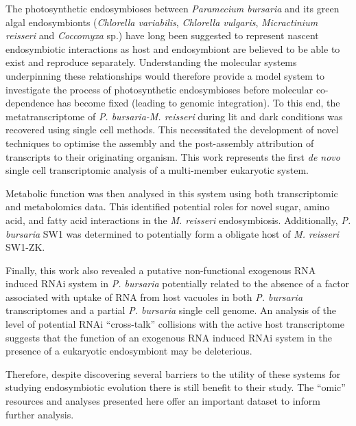The photosynthetic endosymbioses between \textit{Paramecium bursaria} and its green algal endosymbionts 
(\textit{Chlorella variabilis}, \textit{Chlorella vulgaris}, \textit{Micractinium reisseri} and \textit{Coccomyxa} sp.) 
have long been suggested to represent nascent endosymbiotic interactions as host and endosymbiont are believed to be able to exist and reproduce separately. 
Understanding the molecular systems underpinning these relationships would therefore 
provide a model system to investigate the process of photosynthetic endosymbioses 
before molecular co-dependence has become fixed (leading to genomic integration).
To this end, the metatranscriptome of \textit{P. bursaria-M. reisseri} during 
lit and dark conditions was recovered using single cell methods. 
This necessitated the development of novel techniques to optimise the 
assembly and the post-assembly attribution of transcripts to their originating organism. 
This work represents the first \textit{de novo} single cell transcriptomic analysis of a multi-member eukaryotic system.  


Metabolic function was then analysed in this system using both transcriptomic and metabolomics data.
This identified potential roles for novel sugar, amino acid, and 
fatty acid interactions in the \textit{M. reisseri} endosymbiosis.
Additionally, \textit{P. bursaria} SW1 was determined to potentially form a obligate host of
\textit{M. reisseri} SW1-ZK.

 
Finally, this work also revealed a putative non-functional exogenous RNA induced 
RNAi system in \textit{P. bursaria} potentially related to the absence of a factor 
associated with uptake of RNA from host vacuoles in both \textit{P. bursaria}
transcriptomes and a partial \textit{P. bursaria} single cell genome.  
An analysis of the level of potential RNAi ``cross-talk'' 
collisions with the active host transcriptome suggests that the function of an 
exogenous RNA induced RNAi system in the presence of a eukaryotic endosymbiont may be deleterious.

 
Therefore, despite discovering several barriers to the utility of these systems for studying
endosymbiotic evolution there is still benefit to their study. The ``omic'' resources and analyses 
presented here offer an important dataset to inform further analysis.
